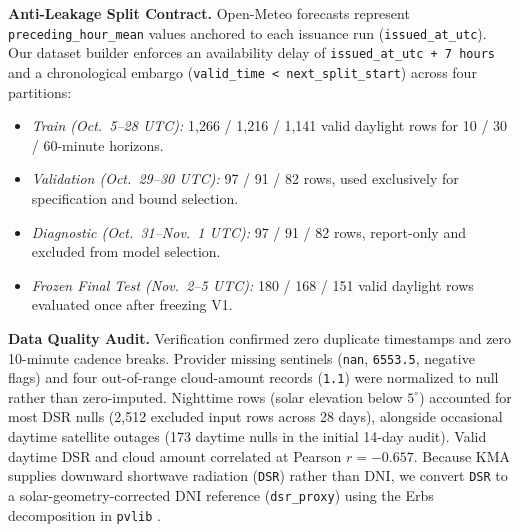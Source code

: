 \documentclass[conference]{IEEEtran}
\begin{document}
\textbf{Anti-Leakage Split Contract.} Open-Meteo forecasts represent \texttt{preceding\_hour\_mean} values anchored to each issuance run (\texttt{issued\_at\_utc}). Our dataset builder enforces an availability delay of \texttt{issued\_at\_utc + 7 hours} and a chronological embargo (\texttt{valid\_time < next\_split\_start}) across four partitions:
\begin{itemize}
\item \textit{Train (Oct.~5--28 UTC):} 1,266 / 1,216 / 1,141 valid daylight rows for 10 / 30 / 60-minute horizons.
\item \textit{Validation (Oct.~29--30 UTC):} 97 / 91 / 82 rows, used exclusively for specification and bound selection.
\item \textit{Diagnostic (Oct.~31--Nov.~1 UTC):} 97 / 91 / 82 rows, report-only and excluded from model selection.
\item \textit{Frozen Final Test (Nov.~2--5 UTC):} 180 / 168 / 151 valid daylight rows evaluated once after freezing V1.
\end{itemize}

\textbf{Data Quality Audit.} Verification confirmed zero duplicate timestamps and zero 10-minute cadence breaks. Provider missing sentinels (\texttt{nan}, \texttt{6553.5}, negative flags) and four out-of-range cloud-amount records (\texttt{1.1}) were normalized to null rather than zero-imputed. Nighttime rows (solar elevation below $5^\circ$) accounted for most DSR nulls (2,512 excluded input rows across 28 days), alongside occasional daytime satellite outages (173 daytime nulls in the initial 14-day audit). Valid daytime DSR and cloud amount correlated at Pearson $r = -0.657$. Because KMA supplies downward shortwave radiation (\texttt{DSR}) rather than DNI, we convert \texttt{DSR} to a solar-geometry-corrected DNI reference (\texttt{dsr\_proxy}) using the Erbs decomposition \cite{b1} in \texttt{pvlib} \cite{b4}.
\end{document}
